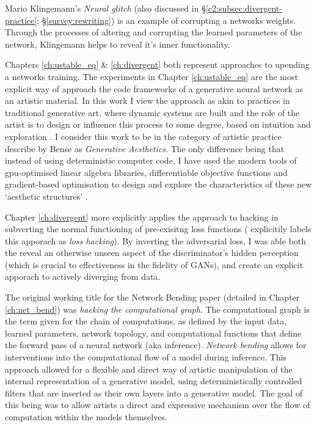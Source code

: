 Mario Klingemann's \textit{Neural glitch} (also discussed in \S \ref{c2:subsec:divergent-practice}; \S \ref{survey:rewriting}) is an example of corrupting a networks weights. 
Through the processes of altering and corrupting the learned parameters of the network, Klingemann helps to reveal it's inner functionality.

Chapters \ref{ch:ustable_eq} \& \ref{ch:divergent} both represent approaches to upending a networks training. 
The experiments in Chapter \ref{ch:ustable_eq} are the most explicit way of approach the code frameworks of a generative neural network as an artistic material.
In this work I view the approach as akin to practices in traditional generative art, where dynamic systems are built and the role of the artist is to design or influence this process to some degree, based on intuition and exploration \cite{mccormack2004generative}.
I consider this work to be in the category of artistic practice describe by Bense as \textit{Generative Aesthetics}.
The only difference being that instead of using deterministic computer code, I have used the modern tools of gpu-optimised linear algebra libraries, differentiable objective functions and gradient-based optimisation to design and explore the characteristics of these new `aesthetic structures' \cite{bense1965projekte}.

Chapter \ref{ch:divergent} more explicitly applies the approach to hacking in subverting the normal functioning of pre-exisitng loss functions (\cite{berns2020bridging} explicitily labels this apporach as \textit{loss hacking}).
By inverting the adversarial loss, I was able both the reveal an otherwise unseen aspect of the discriminator's hidden perception (which is crucial to effectiveness in the fidelity of GANs), and create an explicit apporach to actively diverging from data.

The original working title for the Network Bending paper (detailed in Chapter \ref{ch:net_bend}) was \textit{hacking the computational graph}.
The computational graph is the term given for the chain of computations, as defined by the input data, learned parameters, network topology, and computational functions that define the forward pass of a neural network (aka inference). \textit{Network bending} allows for interventions into the computational flow of a model during inference. 
This approach allowed for a flexible and direct way of artistic manipulation of the internal representation of a generative model, using deterministically controlled filters that are inserted as their own layers into a generative model.
The goal of this being was to allow artists a direct and expressive mechanism over the flow of computation within the models themselves.

